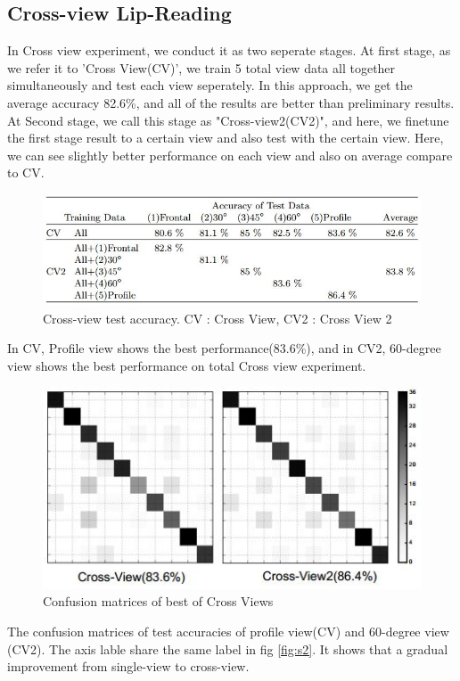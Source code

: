\subsection{Cross-view Lip-Reading}
In Cross view experiment, we conduct it as two seperate stages. At first stage, as we refer it to 'Cross View(CV)', we train 5 total view data all together simultaneously and test each view seperately.  In this approach, we get the
average accuracy 82.6\%, and all of the results are better than preliminary results.
 At Second stage, we call this stage as "Cross-view2(CV2)", and here, we finetune the first stage result to a certain view and also test with the certain view. Here, we can see slightly better performance on each view and also on average compare to CV.
  
\begin{figure}[h]
	\centering
	\includegraphics[width=\columnwidth]{fig/c1.jpg}
	\caption{Cross-view test accuracy. CV : Cross View, CV2 : Cross View 2}
	\label{fig:c1}
\end{figure}
In CV, Profile view shows the best performance(83.6\%), and in CV2, 60-degree view shows the best performance on total Cross view experiment.

\begin{figure}[h]
	\centering
	\includegraphics[width=\columnwidth]{fig/c2.jpg}
	\caption{Confusion matrices of best of  Cross Views}
	\label{fig:c2}
\end{figure}
The confusion matrices of test accuracies of profile view(CV) and 60-degree view (CV2). The axis lable share the same label in fig \ref{fig:s2}. It shows that
a gradual improvement from single-view to cross-view.  

